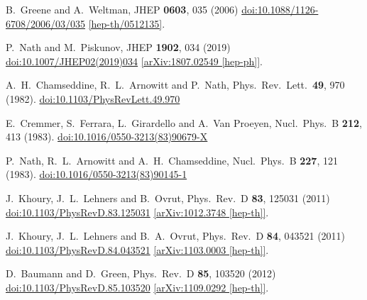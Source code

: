 \documentclass[11pt]{article}
\begin{document}
\begin{thebibliography}{99}
  B.~Greene and A.~Weltman,
  JHEP {\bf 0603}, 035 (2006)
  \href{https://dx.doi.org/10.1088/1126-6708/2006/03/035}{doi:10.1088/1126-6708/2006/03/035}
  \href{https://arxiv.org/abs/hep-th/0512135}{[hep-th/0512135]}.

  P.~Nath and M.~Piskunov,
  JHEP {\bf 1902}, 034 (2019)
  \href{https://dx.doi.org/10.1007/JHEP02(2019)034}{doi:10.1007/JHEP02(2019)034}
  \href{https://arxiv.org/abs/1807.02549}{[arXiv:1807.02549 [hep-ph]]}.

  A.~H.~Chamseddine, R.~L.~Arnowitt and P.~Nath,
  Phys.\ Rev.\ Lett.\  {\bf 49}, 970 (1982).
  \href{https://dx.doi.org/10.1103/PhysRevLett.49.970}{doi:10.1103/PhysRevLett.49.970}

  E.~Cremmer, S.~Ferrara, L.~Girardello and A.~Van Proeyen,
  Nucl.\ Phys.\ B {\bf 212}, 413 (1983).
  \href{https://dx.doi.org/10.1016/0550-3213(83)90679-X}{doi:10.1016/0550-3213(83)90679-X}

  P.~Nath, R.~L.~Arnowitt and A.~H.~Chamseddine,
  Nucl.\ Phys.\ B {\bf 227}, 121 (1983).
  \href{https://dx.doi.org/10.1016/0550-3213(83)90145-1}{doi:10.1016/0550-3213(83)90145-1}

  J.~Khoury, J.~L.~Lehners and B.~Ovrut,
  Phys.\ Rev.\ D {\bf 83}, 125031 (2011)
  \href{https://dx.doi.org/10.1103/PhysRevD.83.125031}{doi:10.1103/PhysRevD.83.125031}
  \href{https://arxiv.org/abs/1012.3748}{[arXiv:1012.3748 [hep-th]]}.

  J.~Khoury, J.~L.~Lehners and B.~A.~Ovrut,
  Phys.\ Rev.\ D {\bf 84}, 043521 (2011)
  \href{https://dx.doi.org/10.1103/PhysRevD.84.043521}{doi:10.1103/PhysRevD.84.043521}
  \href{https://arxiv.org/abs/1103.0003}{[arXiv:1103.0003 [hep-th]]}.

  D.~Baumann and D.~Green,
  Phys.\ Rev.\ D {\bf 85}, 103520 (2012)
  \href{https://dx.doi.org/10.1103/PhysRevD.85.103520}{doi:10.1103/PhysRevD.85.103520}
  \href{https://arxiv.org/abs/1109.0292}{[arXiv:1109.0292 [hep-th]]}.


\end{thebibliography}
\end{document}
